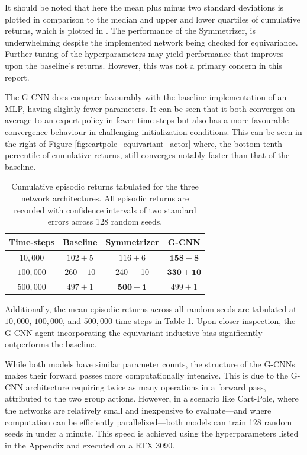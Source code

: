 It should be noted that here the mean plus minus two standard deviations is plotted in comparison to the median and upper and lower quartiles of cumulative returns, which is plotted in \cite{vanderpol2020mdp}. The performance of the Symmetrizer, is underwhelming despite the implemented network being checked for equivariance. Further tuning of the hyperparameters may yield performance that improves upon the baseline's returns. However, this was not a primary concern in this report.

The G-CNN does compare favourably with the baseline implementation of an MLP, having slightly fewer parameters. It can be seen that it both converges on average to an expert policy in fewer time-steps but also has a more favourable convergence behaviour in challenging initialization conditions. This can be seen in the right of Figure \ref{fig:cartpole_equivariant_actor} where, the bottom tenth percentile of cumulative returns, still converges notably faster than that of the baseline.

\begin{table}
	\centering
	\begin{tabular}{|c|c|c|c|}
		\hline
		Time-steps & Baseline     & Symmetrizer          & G-CNN                 \\
		\hline
		$10, 000$  & $102 \pm 5$  & $116 \pm 6$          & $\mathbf{158 \pm 8}$  \\
		$100, 000$ & $260 \pm 10$ & $240 \pm$ 10         & $\mathbf{330 \pm 10}$ \\
		$500,000$  & $497 \pm 1$  & $\mathbf{500 \pm 1}$ & $499 \pm 1$           \\
		\hline
	\end{tabular}
	\caption{Cumulative episodic returns tabulated for the three network architectures. All episodic returns are recorded with confidence intervals of two standard errors across 128 random seeds.}
	\label{tab:actor-critic}
\end{table}
Additionally, the mean episodic returns across all random seeds are tabulated at $10,000$, $100,000$, and $500,000$ time-steps in Table \ref{tab:actor-critic}. Upon closer inspection, the G-CNN agent incorporating the equivariant inductive bias significantly outperforms the baseline.

While both models have similar parameter counts, the structure of the G-CNNs makes their forward passes more computationally intensive. This is due to the G-CNN architecture requiring twice as many operations in a forward pass, attributed to the two group actions. However, in a scenario like Cart-Pole, where the networks are relatively small and inexpensive to evaluate—and where computation can be efficiently parallelized—both models can train 128 random seeds in under a minute. This speed is achieved using the hyperparameters listed in the Appendix and executed on a RTX 3090.

